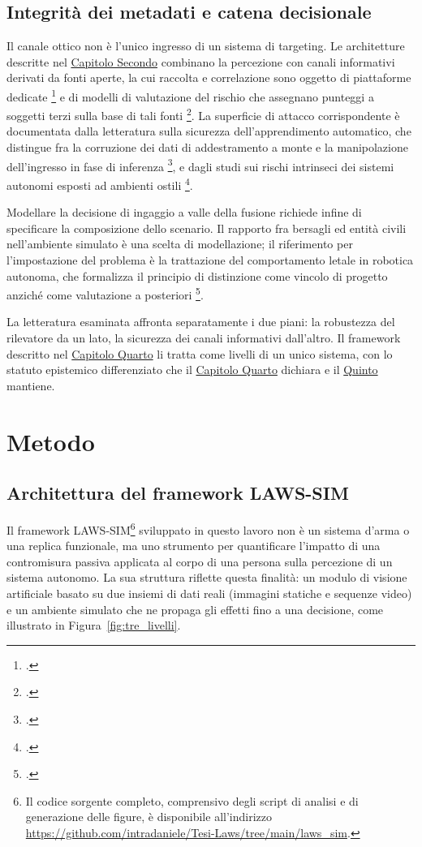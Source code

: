 \ifstampa\documentclass[a4paper,12pt,twoside,openright]{report}\else\documentclass[a4paper,12pt]{report}\fi
\newif\ifrevisione \revisionefalse
\DeclareRobustCommand{\rev}[1]{\ifrevisione{\color{blue!65!black}#1}\else#1\fi}
\begin{document}
\section{Integrità dei metadati e catena decisionale}
\label{sec:sota_metadati}

Il canale ottico non è l'unico ingresso di un sistema di targeting. Le
architetture descritte nel \hyperref[cap2]{Capitolo Secondo} combinano la percezione con
canali informativi derivati da fonti aperte, la cui raccolta e correlazione sono
oggetto di piattaforme dedicate \footcite{gonzalez_2021_etip} e di modelli di
valutazione del rischio che assegnano punteggi a soggetti terzi sulla base di
tali fonti \footcite{asili_2025_gentprm}. La superficie di attacco corrispondente
è documentata dalla letteratura sulla sicurezza dell'apprendimento automatico,
che distingue fra la corruzione dei dati di addestramento a monte e la
manipolazione dell'ingresso \rev{in fase di inferenza} \footcite{cina_2023_poisoning},
e dagli studi sui rischi intrinseci dei sistemi autonomi esposti ad ambienti
ostili \footcite{podar_2025}.

Modellare la decisione di ingaggio a valle della fusione richiede infine di
specificare la composizione dello scenario. \rev{Il rapporto fra bersagli ed entità civili nell'ambiente simulato è una
scelta di modellazione; il riferimento per l'impostazione del problema è} la trattazione
del comportamento letale in robotica autonoma, che formalizza il principio di
distinzione come vincolo di progetto anziché come valutazione a posteriori
\footcite{arkin_2009}.

La letteratura esaminata affronta separatamente i due piani: la robustezza del
rilevatore da un lato, la sicurezza dei canali informativi dall'altro. Il
framework descritto nel \hyperref[cap4]{Capitolo Quarto} li tratta come livelli di un unico
sistema, con lo statuto epistemico differenziato che il \rev{\hyperref[cap4]{Capitolo Quarto}
dichiara e il \hyperref[cap5]{Quinto}} mantiene.


\chapter{Metodo}
\label{cap4}

\section{Architettura del framework LAWS-SIM}
\label{sec:laws_sim}

Il framework LAWS-SIM\footnote{Il codice sorgente completo, comprensivo degli
script di analisi e di generazione delle figure, è disponibile
all'indirizzo \url{https://github.com/intradaniele/Tesi-Laws/tree/main/laws_sim}.}
sviluppato in questo lavoro non è un sistema d'arma o una replica funzionale, ma
uno strumento per quantificare l'impatto di una contromisura passiva applicata al
corpo di una persona sulla percezione di un sistema autonomo. La sua struttura
riflette questa finalità: un modulo di \rev{visione artificiale} basato su due \rev{insiemi di dati}
reali \rev{(immagini statiche e sequenze video)} e un ambiente simulato che ne propaga gli effetti fino a una decisione,
come illustrato in Figura~\ref{fig:tre_livelli}.
\end{document}
